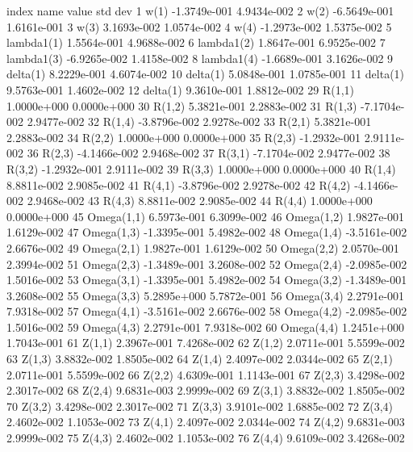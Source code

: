 \beginexample
 index   name    value      std dev   
    1   w(1)       -1.3749e-001 4.9434e-002
    2   w(2)       -6.5649e-001 1.6161e-001
    3   w(3)        3.1693e-002 1.0574e-002
    4   w(4)       -1.2973e-002 1.5375e-002
    5   lambda1(1)  1.5564e-001 4.9688e-002
    6   lambda1(2)  1.8647e-001 6.9525e-002
    7   lambda1(3)  -6.9265e-002 1.4158e-002
    8   lambda1(4)  -1.6689e-001 3.1626e-002
    9   delta(1)    8.2229e-001 4.6074e-002
   10   delta(1)    5.0848e-001 1.0785e-001
   11   delta(1)    9.5763e-001 1.4602e-002
   12   delta(1)    9.3610e-001 1.8812e-002
   29   R(1,1)      1.0000e+000 0.0000e+000
   30   R(1,2)      5.3821e-001 2.2883e-002
   31   R(1,3)      -7.1704e-002 2.9477e-002
   32   R(1,4)      -3.8796e-002 2.9278e-002
   33   R(2,1)      5.3821e-001 2.2883e-002
   34   R(2,2)      1.0000e+000  0.0000e+000
   35   R(2,3)      -1.2932e-001 2.9111e-002
   36   R(2,3)      -4.1466e-002 2.9468e-002
   37   R(3,1)      -7.1704e-002 2.9477e-002
   38   R(3,2)      -1.2932e-001 2.9111e-002
   39   R(3,3)      1.0000e+000  0.0000e+000
   40   R(1,4)      8.8811e-002 2.9085e-002
   41   R(4,1)      -3.8796e-002 2.9278e-002
   42   R(4,2)      -4.1466e-002 2.9468e-002
   43   R(4,3)      8.8811e-002 2.9085e-002
   44   R(4,4)      1.0000e+000  0.0000e+000
   45   Omega(1,1)  6.5973e-001 6.3099e-002
   46   Omega(1,2)  1.9827e-001 1.6129e-002
   47   Omega(1,3)  -1.3395e-001 5.4982e-002
   48   Omega(1,4)  -3.5161e-002 2.6676e-002
   49   Omega(2,1)  1.9827e-001 1.6129e-002
   50   Omega(2,2)  2.0570e-001 2.3994e-002
   51   Omega(2,3)  -1.3489e-001 3.2608e-002
   52   Omega(2,4)  -2.0985e-002 1.5016e-002
   53   Omega(3,1)  -1.3395e-001 5.4982e-002
   54   Omega(3,2)  -1.3489e-001 3.2608e-002
   55   Omega(3,3)  5.2895e+000 5.7872e-001
   56   Omega(3,4)  2.2791e-001 7.9318e-002
   57   Omega(4,1)  -3.5161e-002 2.6676e-002
   58   Omega(4,2)  -2.0985e-002 1.5016e-002
   59   Omega(4,3)  2.2791e-001 7.9318e-002
   60   Omega(4,4)  1.2451e+000 1.7043e-001
   61   Z(1,1)      2.3967e-001 7.4268e-002
   62   Z(1,2)      2.0711e-001 5.5599e-002
   63   Z(1,3)      3.8832e-002 1.8505e-002
   64   Z(1,4)      2.4097e-002 2.0344e-002
   65   Z(2,1)      2.0711e-001 5.5599e-002
   66   Z(2,2)      4.6309e-001 1.1143e-001
   67   Z(2,3)      3.4298e-002 2.3017e-002
   68   Z(2,4)      9.6831e-003 2.9999e-002
   69   Z(3,1)      3.8832e-002 1.8505e-002
   70   Z(3,2)      3.4298e-002 2.3017e-002
   71   Z(3,3)      3.9101e-002 1.6885e-002
   72   Z(3,4)      2.4602e-002 1.1053e-002
   73   Z(4,1)      2.4097e-002 2.0344e-002
   74   Z(4,2)      9.6831e-003 2.9999e-002
   75   Z(4,3)      2.4602e-002 1.1053e-002
   76   Z(4,4)      9.6109e-002 3.4268e-002
\endexample

